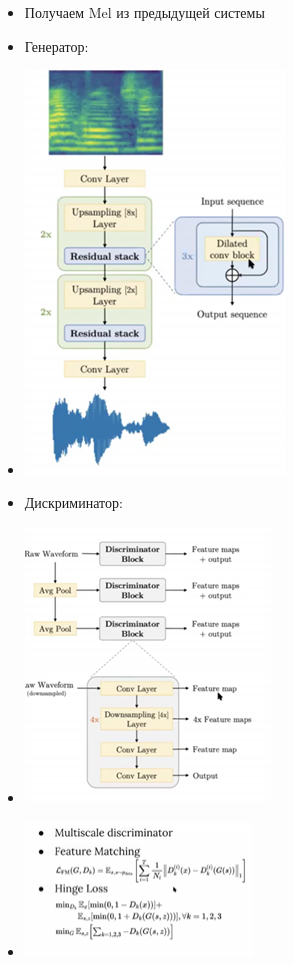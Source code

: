 \documentclass[a4paper, 12pt]{article}
\begin{document}
\begin{itemize}
\item
  
  Получаем Mel из предыдущей системы
  
\item
  
  Генератор:
  
\item
  
  \includegraphics[width=2.72396in,height=4.21565in]{media/image21.png}
  
\item
  
  Дискриминатор:
  
\item
  
  \includegraphics[width=2.56771in,height=2.87530in]{media/image20.png}
  
\item
  
  \includegraphics[width=2.38021in,height=1.41285in]{media/image1.png}
  
\end{itemize}
\end{document}
